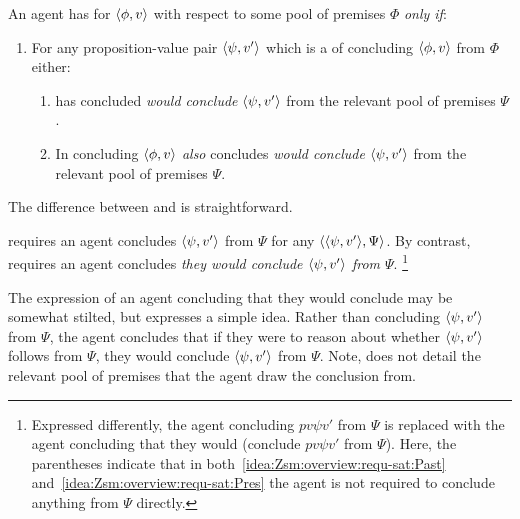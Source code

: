 \begin{note}
  \begin{idea}
    \label{idea:Zsm:overview}
    An agent \vAgent{} has \Zsm{} for \(\langle \phi, v \rangle\) with respect to some pool of premises \(\Phi\) \emph{only if}:
    \begin{enumerate}[label=\arabic*., ref=\named{Z\(^{-}\)S:\arabic*}]
    \item
      \label{idea:Zsm:overview:requ}
      For any proposition-value pair \(\langle \psi, v' \rangle\) which is a \requ{} of concluding \(\langle \phi, v \rangle\) from \(\Phi\) either:
      \begin{enumerate}[label=\alph*., ref=\named{Z\(^{-}\)S:1.\alph*}]
      \item
        \label{idea:Zsm:overview:requ-sat:Past}
        \vAgent{} has concluded \emph{\vAgent{} would conclude} \(\langle \psi, v' \rangle\) from the relevant pool of premises \(\Psi\).
      \item
        \label{idea:Zsm:overview:requ-sat:Pres}
        In concluding \(\langle \phi, v \rangle\) \vAgent{} \emph{also} concludes \emph{\vAgent{} would conclude} \(\langle \psi, v' \rangle\) from the relevant pool of premises \(\Psi\).
      \end{enumerate}
    \end{enumerate}
    \vspace{-\baselineskip}
  \end{idea}
\end{note}

\begin{note}
  The difference between \iZs{} and \iZsm{} is straightforward.

  \iZs{} requires an agent concludes \(\langle \psi, v' \rangle\) from \(\Psi\) for any \requ{} \(\langle \langle \psi, v' \rangle, \Psi \rangle\).
  By contrast, \iZsm{} requires an agent concludes \emph{they would conclude \(\langle \psi, v' \rangle\) from \(\Psi\)}.%
  \footnote{
    Expressed differently, the agent concluding \(pv{\psi}{v'}\) from \(\Psi\) is replaced with the agent concluding that they would (conclude \(pv{\psi}{v'}\) from \(\Psi\)).
    Here, the parentheses indicate that in both~\ref{idea:Zsm:overview:requ-sat:Past} and~\ref{idea:Zsm:overview:requ-sat:Pres} the agent is not required to conclude anything from \(\Psi\) directly.
  }

  The expression of an agent concluding that they would conclude may be somewhat stilted, but expresses a simple idea.
  Rather than concluding \(\langle \psi, v' \rangle\) from \(\Psi\), the agent concludes that if they were to reason about whether \(\langle \psi, v' \rangle\) follows from \(\Psi\), they would conclude \(\langle \psi, v' \rangle\) from \(\Psi\).
  Note, \iZsm{} does not detail the relevant pool of premises that the agent draw the conclusion from.
\end{note}

